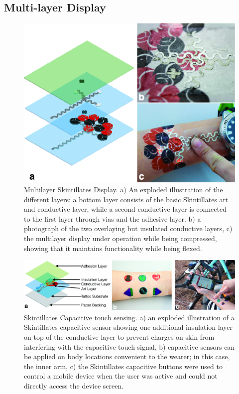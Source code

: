 \documentclass{sigchi}
\begin{document}
\subsection{Multi-layer Display}
\begin{figure}
\centering
\includegraphics[width=1\columnwidth]{figures/Figure7}
\caption{Multilayer Skintillates Display. a) An exploded illustration of the different layers: a bottom layer consists of the basic Skintillates art and conductive layer, while a second conductive layer is connected to the first layer through vias and the adhesive layer. b) a photograph of the two overlaying but insulated conductive layers, c) the multilayer display under operation while being compressed, showing that it maintains functionality while being flexed.}
\vspace{-8pt}
\label{fig:multilayer}
\end{figure}
\begin{figure}
\centering
\includegraphics[width=1\textwidth]{figures/Figure8}
\caption{Skintillates Capacitive touch sensing. a) an exploded illustration of a Skintillates capacitive sensor showing one additional insulation layer on top of the conductive layer to prevent charges on skin from interfering with the capacitive touch signal, b) capacitive sensors can be applied on body locations convenient to the wearer; in this case, the inner arm, c) the Skintillates capacitive buttons were used to control a mobile device when the user was active and could not directly access the device screen.}
\vspace{-8pt}
\label{fig:capacitive}
\end{figure}
\end{document}
